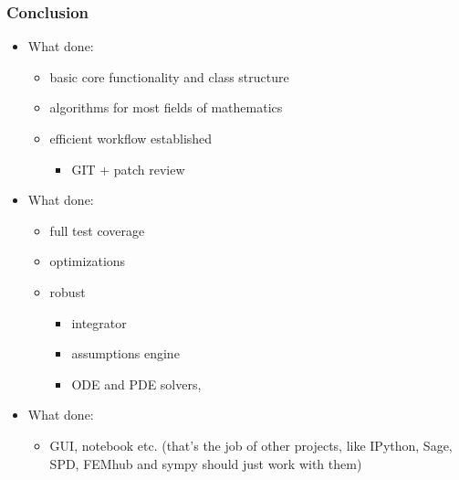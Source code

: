 \documentclass{beamer}
\begin{document}
\begin{frame}
    \frametitle{Conclusion}

    \begin{itemize}
        \item<1-> What  done:
            \begin{itemize}
                \item basic core functionality and class structure
                \item algorithms for most fields of mathematics
                \item efficient workflow established
                \begin{itemize}
                    \item GIT + patch review
                \end{itemize}
            \end{itemize}
        \item<2-> What  done:
            \begin{itemize}
                \item full test coverage
                \item optimizations
                \item robust
                \begin{itemize}
                    \item integrator
                    \item assumptions engine
                    \item ODE and PDE solvers, \structure{\ldots}
                \end{itemize}
            \end{itemize}
        \item<3-> What  done:
            \begin{itemize}
                \item GUI, notebook etc. (that's the job of other projects,
                like IPython, Sage, SPD, FEMhub and sympy should just work with
                them)
            \end{itemize}
    \end{itemize}
\end{frame}


%
%    
%    
\end{document}
